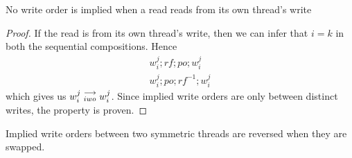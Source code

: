 
    \begin{property}
        \label{prop2}
        No write order is implied when a read reads from its own thread's write
    \end{property}

    \begin{proof}
        If the read is from its own thread's write, then we can infer that $i=k$ in both the sequential compositions. Hence  
        \begin{align*}
            w_i^j;rf;po;w_i^j \\
            w_i^j;po;rf^{-1};w_i^j
        \end{align*} 
        which gives us $w_i^j\stackrel{\longrightarrow}{_{iwo}}w_i^j$.
        Since implied write orders are only between distinct writes, the property is proven.  
    \end{proof}

        

    \begin{property}
        \label{prop3}
        Implied write orders between two symmetric threads are reversed when they are swapped.
    \end{property}
        
